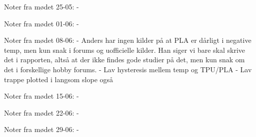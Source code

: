 Noter fra mødet 25-05:
- 

Noter fra mødet 01-06:
- 

Noter fra mødet 08-06:
- Anders har ingen kilder på at PLA er dårligt i negative temp, men kun snak i forums og uofficielle kilder. Han siger vi bare skal skrive det i rapporten, altså at der ikke findes gode studier på det, men kun snak om det i forskellige hobby forums.
- Lav hysteresis mellem temp og TPU/PLA
- Lav trappe plotted i langsom slope også


Noter fra mødet 15-06:
- 

Noter fra mødet 22-06:
- 

Noter fra mødet 29-06:
- 